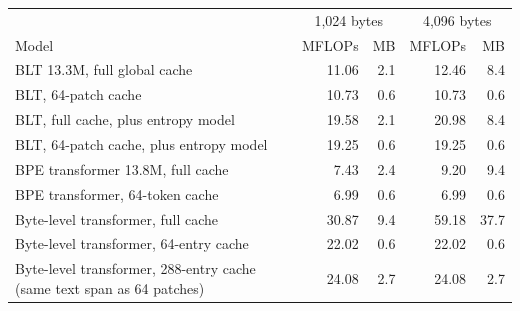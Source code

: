 \begin{tabular}{@{}lrrrr@{}}
\toprule
 & \multicolumn{2}{c}{1,024 bytes} & \multicolumn{2}{c}{4,096 bytes}\\
Model & MFLOPs & MB & MFLOPs & MB\\
\midrule
BLT 13.3M, full global cache & 11.06 & 2.1 & 12.46 & 8.4\\
BLT, 64-patch cache & 10.73 & 0.6 & 10.73 & 0.6\\
BLT, full cache, plus entropy model & 19.58 & 2.1 & 20.98 & 8.4\\
BLT, 64-patch cache, plus entropy model & 19.25 & 0.6 & 19.25 & 0.6\\
BPE transformer 13.8M, full cache & 7.43 & 2.4 & 9.20 & 9.4\\
BPE transformer, 64-token cache & 6.99 & 0.6 & 6.99 & 0.6\\
Byte-level transformer, full cache & 30.87 & 9.4 & 59.18 & 37.7\\
Byte-level transformer, 64-entry cache & 22.02 & 0.6 & 22.02 & 0.6\\
Byte-level transformer, 288-entry cache (same text span as 64 patches) & 24.08 & 2.7 & 24.08 & 2.7\\
\bottomrule
\end{tabular}
